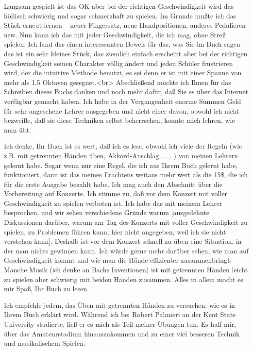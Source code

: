 Langsam gespielt ist das OK aber bei der richtigen Geschwindigkeit wird das höllisch schwierig und sogar schmerzhaft zu spielen.
Im Grunde mußte ich das Stück erneut lernen -- neuer Fingersatz, neue Handpositionen, anderes Pedalieren usw.
Nun kann ich das mit jeder Geschwindigkeit, die ich mag, ohne Streß spielen.
Ich fand das einen interessanten Beweis für das, was Sie im Buch sagen -- das ist ein sehr kleines Stück, das ziemlich einfach erscheint aber bei der richtigen Geschwindigkeit seinen Charakter völlig ändert und jeden Schüler frustrieren wird, der die intuitive Methode benutzt, es sei denn er ist mit einer Spanne von mehr als 1,5 Oktaven gesegnet.<br>
Abschließend möchte ich Ihnen für das Schreiben dieses Buchs danken und noch mehr dafür, daß Sie es über das Internet verfügbar gemacht haben.
Ich habe in der Vergangenheit enorme Summen Geld für sehr angesehene Lehrer ausgegeben und nicht einer davon, obwohl ich nicht bezweifle, daß sie diese Techniken selbst beherrschen, konnte mich lehren, wie man übt.


\item \label{testimonials10}
Ich denke, Ihr Buch ist es wert, daß ich es lese, obwohl ich viele der Regeln (wie z.B. mit getrennten Händen üben, Akkord-Anschlag . . . ) von meinen Lehrern gelernt habe.
Sogar wenn nur eine Regel, die ich aus Ihrem Buch gelernt habe, funktioniert, dann ist das meines Erachtens weitaus mehr wert als die 15\$, die ich für die erste Ausgabe bezahlt habe.
Ich mag auch den Abschnitt über die Vorbereitung auf Konzerte.
Ich stimme zu, daß vor dem Konzert mit voller Geschwindigkeit zu spielen verboten ist.
Ich habe das mit meinem Lehrer besprochen, und wir sehen verschiedene Gründe warum [ausgedehnte Diskussionen darüber, warum am Tag des Konzerts mit voller Geschwindigkeit zu spielen, zu Problemen führen kann; hier nicht angegeben, weil ich sie nicht verstehen kann].
Deshalb ist vor dem Konzert schnell zu üben eine Situation, in der man nichts gewinnen kann.
Ich würde gerne mehr darüber sehen, wie man auf Geschwindigkeit kommt und wie man die Hände effizienter zusammenbringt.
Manche Musik (ich denke an Bachs Inventionen) ist mit getrennten Händen leicht zu spielen aber schwierig mit beiden Händen zusammen.
Alles in allem macht es mir Spaß, Ihr Buch zu lesen.


\item \label{testimonials11}
Ich empfehle jedem, das Üben mit getrennten Händen zu versuchen, wie es in Ihrem Buch erklärt wird.
Während ich bei Robert Palmieri an der Kent State University studierte, ließ er es mich als Teil meiner Übungen tun.
Es half mir, über das Amateurstadium hinauszukommen und zu einer viel besseren Technik und musikalischem Spielen.


